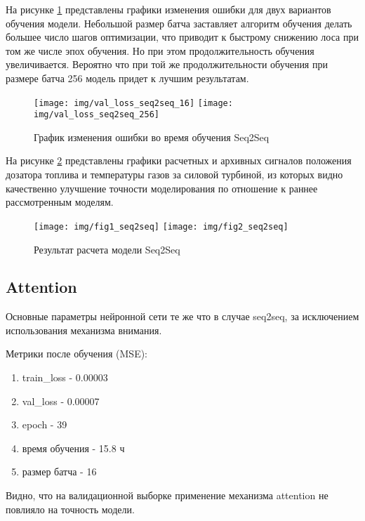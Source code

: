 \documentclass[12pt,a4paper]{article}
\begin{document}
На рисунке \ref{fig:val_loss_seq2seq} представлены графики изменения ошибки для двух вариантов обучения модели. Небольшой размер батча заставляет алгоритм обучения делать большее число шагов оптимизации, что приводит к быстрому снижению лоса при том же числе эпох обучения. Но при этом продолжительность обучения увеличивается. Вероятно что при той же продолжительности обучения при размере батча 256 модель придет к лучшим результатам. 

\begin{figure}[htb]
	\centering\texttt{[image: img/val\_loss\_seq2seq\_16]}
	\centering\texttt{[image: img/val\_loss\_seq2seq\_256]}
	\caption{График изменения ошибки во время обучения Seq2Seq}
	\label{fig:val_loss_seq2seq}
\end{figure}

На рисунке \ref{fig:res_seq2seq} представлены графики расчетных и архивных сигналов положения дозатора топлива и температуры газов за силовой турбиной, из которых видно качественно улучшение точности моделирования по отношение к раннее рассмотренным моделям.

\begin{figure}[htb]
	\centering\texttt{[image: img/fig1\_seq2seq]}
	\centering\texttt{[image: img/fig2\_seq2seq]}
	\caption{Результат расчета модели Seq2Seq}
	\label{fig:res_seq2seq}
\end{figure}


\subsection{Attention}

Основные параметры нейронной сети те же что в случае seq2seq, за исключением использования механизма внимания.

\begin{description}
	\item Метрики после обучения (MSE):
	\renewcommand\labelenumi{}
	\begin{enumerate}
		\item train\_loss - 0.00003
		\item val\_loss - 0.00007
		\item epoch - 39
		\item время обучения - 15.8 ч
		\item размер батча - 16
	\end{enumerate}
\end{description}

Видно, что на валидационной выборке применение механизма attention не повлияло на точность модели.
\end{document}
